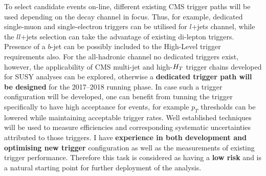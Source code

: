 To select candidate \fourtop events on-line, different existing CMS trigger paths will be used depending on the decay channel in focus. Thus, for example, dedicated single-muon and single-electron triggers can be utilised for $l$+jets channel, while the $ll$+jets selection can take the advantage of existing di-lepton triggers. Presence of a $b$-jet can be possibly included to the High-Level trigger requirements also. For the all-hadronic \fourtop channel no dedicated triggers exist, however, the applicability of CMS multi-jet and high-$\mbox{$H_T$}$ trigger chains developed for SUSY analyses can be explored, otherwise a\textbf{ dedicated trigger path will be designed} for the 2017--2018 running phase. In case such a trigger configuration will be developed, one can benefit from tunning the trigger specifically to have high acceptance for \fourtop events, for example $p_T$ thresholds can be lowered while maintaining acceptable trigger rates. Well established techniques will be used to measure efficiencies and corresponding systematic uncertainties attributed to those triggers. I have \textbf{experience in both development and optimising new trigger} configuration as well as the measurements of existing trigger performance. Therefore this task is considered as having a \textbf{low risk} and is a natural starting point for further deployment of the analysis.